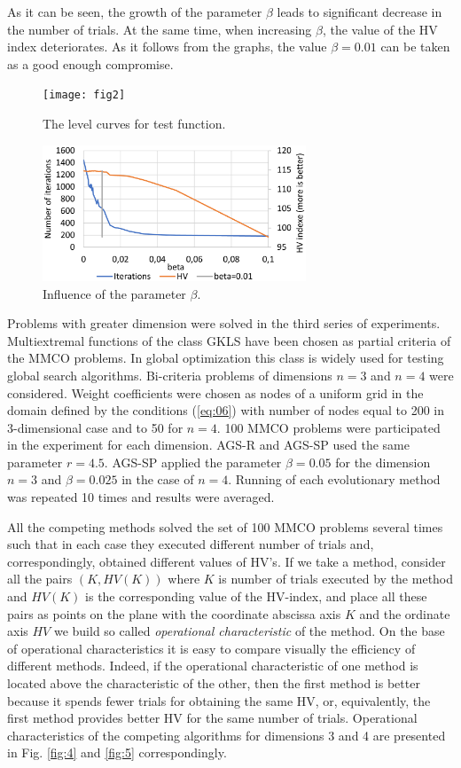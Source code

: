 \documentclass[runningheads]{llncs}
\begin{document}
As it can be seen, the growth of the parameter $\beta$ leads to significant decrease in the number of trials. At the same time, when increasing $\beta$, the value of the HV index deteriorates. As it follows from the graphs, the value $\beta=0.01$ can be taken as a good enough compromise.

\begin{figure}
\centering
\texttt{[image: fig2]}
\caption{The level curves for test function.} \label{fig:2}
\end{figure}

\begin{figure}
\centering
\includegraphics[width=0.7\textwidth]{fig3}
\caption{Influence of the parameter $\beta$.} \label{fig:3}
\end{figure}

Problems with greater dimension were solved in the third series of experiments. Multiextremal functions of the class GKLS \cite{Gaviano2003} have been chosen as partial criteria of the MMCO problems.  In global optimization this class is widely used for testing global search algorithms. Bi-criteria problems of dimensions $n=3$ and $n=4$ were considered. Weight coefficients were chosen as nodes of a uniform grid in the domain defined by the conditions (\ref{eq:06}) with number of nodes equal to 200 in 3-dimensional case and to 50 for $n=4$. 100 MMCO problems were participated in the experiment for each dimension. AGS-R and AGS-SP used the same parameter $r=4.5$. AGS-SP applied the parameter $\beta=0.05$ for the dimension $n=3$ and $\beta=0.025$ in the case of $n=4$.  Running of each evolutionary method was repeated 10 times and results were averaged.   

All the competing methods solved the set of 100 MMCO problems several times such that in each case they executed different number of trials and, correspondingly, obtained different values of HV's. If we take a method, consider all the pairs $(K, HV(K))$ where $K$ is number of trials executed by the method and $HV(K)$ is the corresponding value of the HV-index, and place all these pairs as points on the plane with the coordinate abscissa axis $K$ and the ordinate axis $HV$ we build so called \textit{operational characteristic} \cite{Grishagin2016_2} of the method. On the base of operational characteristics it is easy to compare visually the efficiency of different methods. Indeed, if the operational characteristic of one method is located above the characteristic of the other, then the first method is better because it spends fewer trials for obtaining the same HV, or, equivalently, the first method provides better HV for the same number of trials. Operational characteristics of the competing algorithms for dimensions 3 and 4 are presented in Fig. \ref{fig:4} and \ref{fig:5} correspondingly.
 
\end{document}
